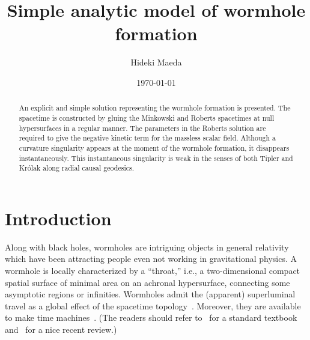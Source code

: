 \documentclass[aps,prd,twocolumn,eqsecnum,showpacs,amsmath]{revtex4}
\begin{document}

\title{
Simple analytic model of wormhole formation
}

\author{Hideki Maeda}




\address{ 
Centro de Estudios Cient\'{\i}ficos (CECS), Arturo Prat 514, Valdivia, Chile
}

\date{\today}

\begin{abstract} 
An explicit and simple solution representing the wormhole formation is presented.
The spacetime is constructed by gluing the Minkowski and Roberts spacetimes at null hypersurfaces in a regular manner.
The parameters in the Roberts solution are required to give the negative kinetic term for the massless scalar field.
Although a curvature singularity appears at the moment of the wormhole formation, it disappears instantaneously.
This instantaneous singularity is weak in the senses of both Tipler and Kr\'{o}lak along radial causal geodesics.
\end{abstract}

\maketitle



\section{Introduction}
Along with black holes, wormholes are intriguing objects in general relativity which have been attracting people even not working in gravitational physics.
A wormhole is locally characterized by a ``throat,'' i.e., a two-dimensional compact spatial surface of minimal area on an achronal hypersurface, connecting some asymptotic regions or infinities.
Wormholes admit the (apparent) superluminal travel as a global effect of the spacetime topology~\cite{visser,superluminal,lobo2007}.
Moreover, they are available to make time machines~\cite{mty1988,timemachine}.
(The readers should refer to~\cite{visser} for a standard textbook and~\cite{lobo2007} for a nice recent review.)
\end{document}
